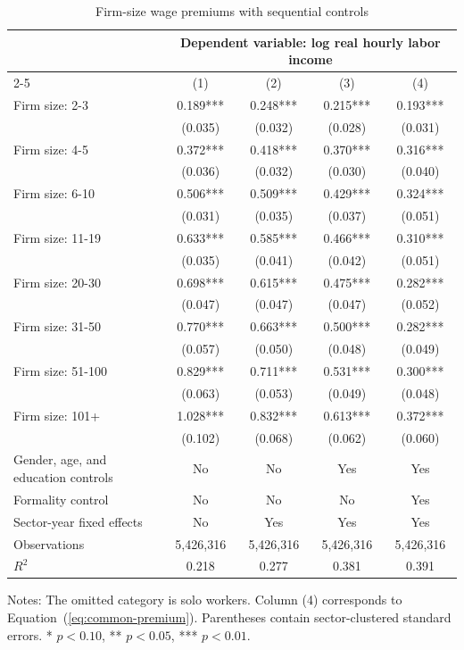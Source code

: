 \begin{table}[htbp]
  \centering
  \caption{Firm-size wage premiums with sequential controls}
  \label{tab:firm-size-wage-premium-regressions}
  \small
  \begin{tabular}{lcccc}
    \toprule
    & \multicolumn{4}{c}{Dependent variable: log real hourly labor income} \\
    \cmidrule(lr){2-5}
    & (1) & (2) & (3) & (4) \\
    \midrule
    Firm size: 2-3 & 0.189*** & 0.248*** & 0.215*** & 0.193*** \\
     & (0.035) & (0.032) & (0.028) & (0.031) \\
    Firm size: 4-5 & 0.372*** & 0.418*** & 0.370*** & 0.316*** \\
     & (0.036) & (0.032) & (0.030) & (0.040) \\
    Firm size: 6-10 & 0.506*** & 0.509*** & 0.429*** & 0.324*** \\
     & (0.031) & (0.035) & (0.037) & (0.051) \\
    Firm size: 11-19 & 0.633*** & 0.585*** & 0.466*** & 0.310*** \\
     & (0.035) & (0.041) & (0.042) & (0.051) \\
    Firm size: 20-30 & 0.698*** & 0.615*** & 0.475*** & 0.282*** \\
     & (0.047) & (0.047) & (0.047) & (0.052) \\
    Firm size: 31-50 & 0.770*** & 0.663*** & 0.500*** & 0.282*** \\
     & (0.057) & (0.050) & (0.048) & (0.049) \\
    Firm size: 51-100 & 0.829*** & 0.711*** & 0.531*** & 0.300*** \\
     & (0.063) & (0.053) & (0.049) & (0.048) \\
    Firm size: 101+ & 1.028*** & 0.832*** & 0.613*** & 0.372*** \\
     & (0.102) & (0.068) & (0.062) & (0.060) \\
    \midrule
    Gender, age, and education controls & No & No & Yes & Yes \\
    Formality control & No & No & No & Yes \\
    Sector-year fixed effects & No & Yes & Yes & Yes \\
    Observations & 5,426,316 & 5,426,316 & 5,426,316 & 5,426,316 \\
    $R^2$ & 0.218 & 0.277 & 0.381 & 0.391 \\
    \bottomrule
  \end{tabular}
  \vspace{0.3em}
  \begin{minipage}{0.95\textwidth}
  \footnotesize
  Notes: The omitted category is solo workers. Column (4) corresponds to Equation~(\ref{eq:common-premium}). Parentheses contain sector-clustered standard errors. * $p<0.10$, ** $p<0.05$, *** $p<0.01$.
  \end{minipage}
\end{table}
